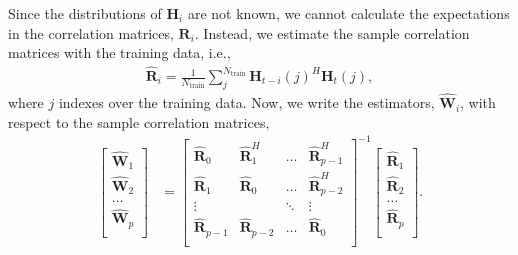 Since the distributions of $\mathbf{H}_i$ are not known, we cannot calculate the expectations in the correlation matrices, $\mathbf R_i$. Instead, we estimate the sample correlation matrices with the training data, i.e.,
\begin{align*}
	\hat{\mathbf{R}}_i = \frac{1}{N_{\text{train}}} \sum_{j}^{N_{\text{train}}} \mathbf{H}_{t-i}(j)^{H}\mathbf{H}_{t}(j),
\end{align*}
where $j$ indexes over the training data. Now, we write the estimators, $\hat{\mathbf{W}}_i$, with respect to the sample correlation matrices,
\begin{align}
  \begin{bmatrix}
    \hat{\mathbf W}_{1} \\ \hat{\mathbf W}_{2} \\ \dots \\ \hat{\mathbf W}_{p} \\
  \end{bmatrix}
  &= 
  \begin{bmatrix}
    \hat{\mathbf R}_{0} & \hat{\mathbf R}_1^H & \dots  & \hat{\mathbf R}_{p-1}^H \\
    \hat{\mathbf R}_{1} & \hat{\mathbf R}_0   & \dots  & \hat{\mathbf R}_{p-2}^H \\
    \vdots      &         & \ddots & \vdots \\
    \hat{\mathbf R}_{p-1} & \hat{\mathbf R}_{p-2}   & \dots  & \hat{\mathbf R}_{0} \\
  \end{bmatrix}^{-1}
  \begin{bmatrix}
    \hat{\mathbf R}_{1} \\ \hat{\mathbf R}_{2} \\ \dots \\ \hat{\mathbf R}_{p} \\
  \end{bmatrix}. \label{eq:toep-sol-est}
\end{align}

